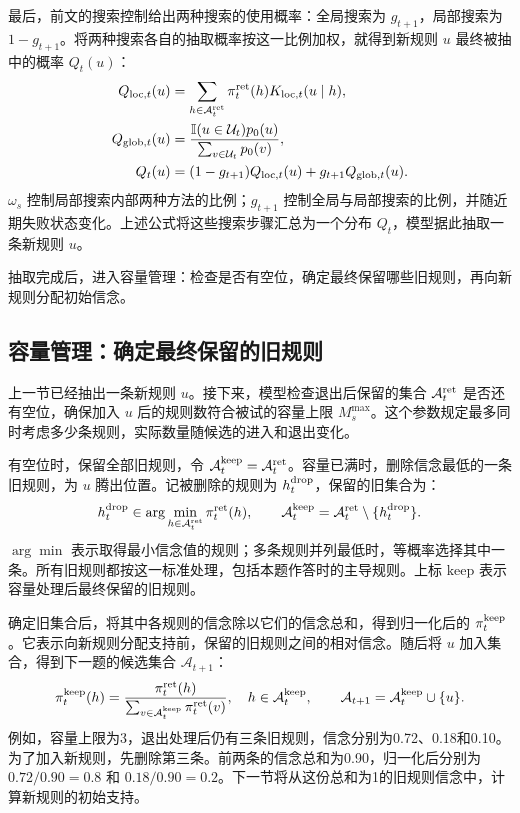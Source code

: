 \documentclass[12pt]{article}
\newcommand{\ind}{\mathbb I}
\begin{document}
最后，前文的搜索控制给出两种搜索的使用概率：全局搜索为 $g_{t+1}$，局部搜索为 $1-g_{t+1}$。将两种搜索各自的抽取概率按这一比例加权，就得到新规则 $u$ 最终被抽中的概率 $Q_t(u)$：
\begin{align}
Q_{{\rm loc},t}(u)&=\sum_{h\in\mathcal A_t^{\rm ret}}\pi_t^{\rm ret}(h)K_{{\rm loc},t}(u\mid h),\\
Q_{{\rm glob},t}(u)&=\frac{\ind(u\in\mathcal U_t)p_0(u)}{\sum_{v\in\mathcal U_t}p_0(v)},\\
Q_t(u)&=(1-g_{t+1})Q_{{\rm loc},t}(u)+g_{t+1}Q_{{\rm glob},t}(u).
\label{eq:proposal-mixture}
\end{align}
$\omega_s$ 控制局部搜索内部两种方法的比例；$g_{t+1}$ 控制全局与局部搜索的比例，并随近期失败状态变化。上述公式将这些搜索步骤汇总为一个分布 $Q_t$，模型据此抽取一条新规则 $u$。

抽取完成后，进入容量管理：检查是否有空位，确定最终保留哪些旧规则，再向新规则分配初始信念。

\subsection{容量管理：确定最终保留的旧规则}

上一节已经抽出一条新规则 $u$。接下来，模型检查退出后保留的集合 $\mathcal A_t^{\rm ret}$ 是否还有空位，确保加入 $u$ 后的规则数符合被试的容量上限 $M_s^{\max}$。这个参数规定最多同时考虑多少条规则，实际数量随候选的进入和退出变化。

有空位时，保留全部旧规则，令 $\mathcal A_t^{\rm keep}=\mathcal A_t^{\rm ret}$。容量已满时，删除信念最低的一条旧规则，为 $u$ 腾出位置。记被删除的规则为 $h_t^{\rm drop}$，保留的旧集合为：
\begin{equation}
h_t^{\rm drop}\in\arg\min_{h\in\mathcal A_t^{\rm ret}}\pi_t^{\rm ret}(h),\qquad
\mathcal A_t^{\rm keep}=\mathcal A_t^{\rm ret}\setminus\{h_t^{\rm drop}\}.
\label{eq:capacity-release}
\end{equation}
$\arg\min$ 表示取得最小信念值的规则；多条规则并列最低时，等概率选择其中一条。所有旧规则都按这一标准处理，包括本题作答时的主导规则。上标 $\mathrm{keep}$ 表示容量处理后最终保留的旧规则。

确定旧集合后，将其中各规则的信念除以它们的信念总和，得到归一化后的 $\pi_t^{\rm keep}$。它表示向新规则分配支持前，保留的旧规则之间的相对信念。随后将 $u$ 加入集合，得到下一题的候选集合 $\mathcal A_{t+1}$：
\begin{equation}
\pi_t^{\rm keep}(h)=\frac{\pi_t^{\rm ret}(h)}{\sum_{v\in\mathcal A_t^{\rm keep}}\pi_t^{\rm ret}(v)},
\quad h\in\mathcal A_t^{\rm keep},\qquad
\mathcal A_{t+1}=\mathcal A_t^{\rm keep}\cup\{u\}.
\label{eq:retained-belief}
\end{equation}
例如，容量上限为3，退出处理后仍有三条旧规则，信念分别为0.72、0.18和0.10。为了加入新规则，先删除第三条。前两条的信念总和为0.90，归一化后分别为 $0.72/0.90=0.8$ 和 $0.18/0.90=0.2$。下一节将从这份总和为1的旧规则信念中，计算新规则的初始支持。
\end{document}
